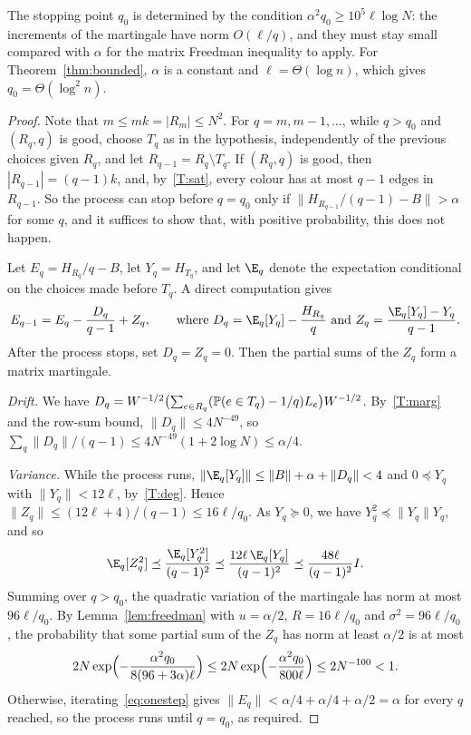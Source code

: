 The stopping point $q_0$ is determined by the condition $\alpha^2q_0\ge10^5\ell\log N$: the increments of the martingale have norm $O(\ell/q)$, and they must stay small compared with $\alpha$ for the matrix Freedman inequality to apply.
For Theorem~\ref{thm:bounded}, $\alpha$ is a constant and $\ell=\Theta(\log n)$, which gives $q_0=\Theta(\log^2n)$.
\begin{proof}
Note that $m\le mk=|R_m|\le N^2$.
For $q=m,m-1,\dots$, while $q>q_0$ and $(R_q,q)$ is good, choose $T_q$ as in the hypothesis, independently of the previous choices given $R_q$, and let $R_{q-1}=R_q\setminus T_q$.
If $(R_q,q)$ is good, then $|R_{q-1}|=(q-1)k$, and, by~\ref{T:sat}, every colour has at most $q-1$ edges in $R_{q-1}$.
So the process can stop before $q=q_0$ only if $\|H_{R_{q-1}}/(q-1)-B\|>\alpha$ for some $q$, and it suffices to show that, with positive probability, this does not happen.

Let $E_q=H_{R_q}/q-B$, let $Y_q=H_{T_q}$, and let $\E_q$ denote the expectation conditional on the choices made before $T_q$. A direct computation gives
\begin{equation}\label{eq:onestep}
E_{q-1}=E_q-\frac{D_q}{q-1}+Z_q,\qquad\text{where }D_q=\E_q[Y_q]-\frac{H_{R_q}}q\text{ and }Z_q=\frac{\E_q[Y_q]-Y_q}{q-1}.
\end{equation}
After the process stops, set $D_q=Z_q=0$. Then the partial sums of the $Z_q$ form a matrix martingale.

\emph{Drift.} We have $D_q=W^{-1/2}\bigl(\sum_{e\in R_q}(\mathbb{P}(e\in T_q)-1/q)L_e\bigr)W^{-1/2}$.
By~\ref{T:marg} and the row-sum bound, $\|D_q\|\le4N^{-49}$, so $\sum_q\|D_q\|/(q-1)\le4N^{-49}(1+2\log N)\le\alpha/4$.

\emph{Variance.} While the process runs, $\|\E_q[Y_q]\|\le\|B\|+\alpha+\|D_q\|<4$ and $0\preceq Y_q$ with $\|Y_q\|<12\ell$, by~\ref{T:deg}.
Hence $\|Z_q\|\le(12\ell+4)/(q-1)\le16\ell/q_0$.
As $Y_q\succeq0$, we have $Y_q^2\preceq\|Y_q\|Y_q$, and so
\[
\E_q[Z_q^2]\preceq\frac{\E_q[Y_q^2]}{(q-1)^2}\preceq\frac{12\ell\,\E_q[Y_q]}{(q-1)^2}\preceq\frac{48\ell}{(q-1)^2}I .
\]
Summing over $q>q_0$, the quadratic variation of the martingale has norm at most $96\ell/q_0$.
By Lemma~\ref{lem:freedman} with $u=\alpha/2$, $R=16\ell/q_0$ and $\sigma^2=96\ell/q_0$, the probability that some partial sum of the $Z_q$ has norm at least $\alpha/2$ is at most
\[
2N\exp\Bigl(-\frac{\alpha^2q_0}{8(96+3\alpha)\ell}\Bigr)\le2N\exp\Bigl(-\frac{\alpha^2q_0}{800\ell}\Bigr)\le2N^{-100}<1 .
\]
Otherwise, iterating~\eqref{eq:onestep} gives $\|E_q\|<\alpha/4+\alpha/4+\alpha/2=\alpha$ for every $q$ reached, so the process runs until $q=q_0$, as required.
\end{proof}
